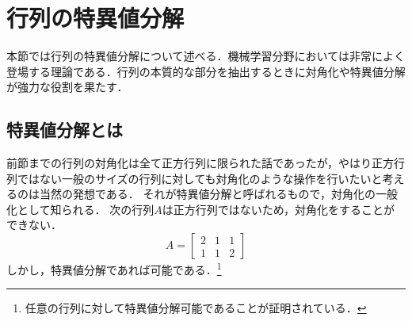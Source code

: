 \documentclass[a4paper,12pt,autodetect-engine,dvipdfmx]{jsarticle}
\theoremstyle{definition}
\begin{document}
\section{行列の特異値分解}
本節では行列の特異値分解について述べる．機械学習分野においては非常によく登場する理論である．行列の本質的な部分を抽出するときに対角化や特異値分解が強力な役割を果たす．
\subsection{特異値分解とは}
前節までの行列の対角化は全て正方行列に限られた話であったが，やはり正方行列ではない一般のサイズの行列に対しても対角化のような操作を行いたいと考えるのは当然の発想である．
それが特異値分解と呼ばれるもので，対角化の一般化として知られる．
次の行列$A$は正方行列ではないため，対角化をすることができない．
\begin{equation*}
    A=
    \begin{bmatrix}
        2 & 1 & 1\\
        1 & 1 & 2
    \end{bmatrix}
\end{equation*}
しかし，特異値分解であれば可能である．\footnote{任意の行列に対して特異値分解可能であることが証明されている．}
\end{document}
